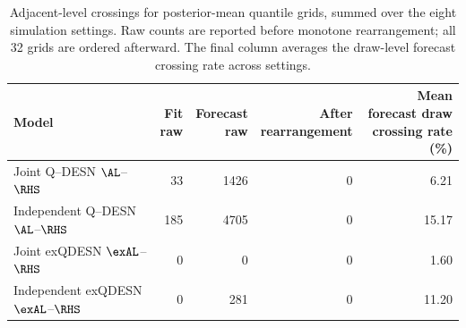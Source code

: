 \begin{table}[!htbp]
\centering
\small
\begin{tabular}{@{}>{\raggedright\arraybackslash}p{}rrrr@{}}
\toprule
Model & \shortstack{Fit\\raw} & \shortstack{Forecast\\raw} & \shortstack{After\\rearrangement} & \shortstack{Mean forecast draw\\crossing rate (\%)} \\
\midrule
Joint Q--DESN \(\AL\)--\(\RHS\) & 33 & 1426 & 0 & 6.21 \\
Independent Q--DESN \(\AL\)--\(\RHS\) & 185 & 4705 & 0 & 15.17 \\
Joint exQDESN \(\exAL\)--\(\RHS\) & 0 & 0 & 0 & 1.60 \\
Independent exQDESN \(\exAL\)--\(\RHS\) & 0 & 281 & 0 & 11.20 \\
\bottomrule
\end{tabular}
\caption{Adjacent-level crossings for posterior-mean quantile grids, summed over the eight simulation settings. Raw counts are reported before monotone rearrangement; all 32 grids are ordered afterward. The final column averages the draw-level forecast crossing rate across settings.}
\label{tab:supp-joint-qdesn-shared-backbone-crossings}
\end{table}
